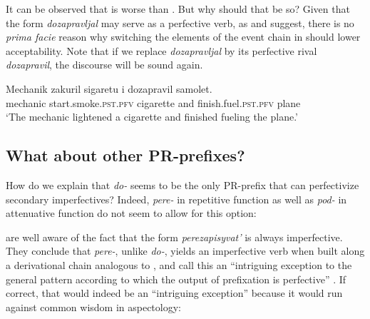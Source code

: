 \documentclass[output=paper,
colorlinks,
citecolor=brown,
newtxmath
]{langscibook}
\begin{document}
\z

\noindent It can be observed that  is worse than . But why should that be so? Given that the form \textit{dozapravljal} may serve as a perfective verb, as \citet{Zinova.Filip2015} and \citet{Zinova2016} suggest, there is no \textit{prima facie} reason why switching the elements of the event chain in  should lower acceptability. Note that if we replace \textit{dozapravljal} by its perfective rival \textit{dozapravil}, the discourse will be sound again.

\ea\label{machaplus}
\gll Mechanik zakuril sigaretu i dozapravil samolet.\\
mechanic {start.smoke.}\textsc{pst.pfv} cigarette and {finish.fuel.}\textsc{pst.pfv} plane\\
\glt `The mechanic lightened a cigarette and finished fueling the plane.'
\z


\subsection{What about other PR-prefixes?}\label{popopo}

How do we explain that \textit{do-} seems to be the only PR-prefix that can perfectivize secondary imperfectives? Indeed, \textit{pere-} in repetitive function as well as \textit{pod-} in attenuative function do not seem to allow for this option:

\z

\z

\noindent \citet{Zinova.Filip2015} are well aware of the fact that the form \textit{perezapisyvat'} is always imperfective. They conclude that \textit{pere-}, unlike \textit{do-}, yields an imperfective verb when built along a derivational chain analogous to , and call this an ``intriguing exception to the general pattern according to which the output of prefixation is perfective'' \citep[605]{Zinova.Filip2015}. If correct, that would indeed be an ``intriguing exception'' because it would run against common wisdom in  aspectology:
\end{document}
